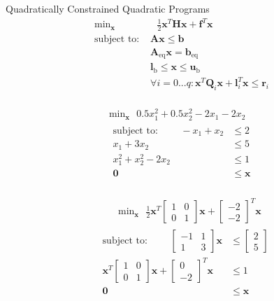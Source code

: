 \documentclass{article}
\begin{document}
Quadratically Constrained Quadratic Programs
\begin{align*}
    \text{min}_{\mathbf{x}}& \text{ } \frac{1}{2}\mathbf{x}^T \mathbf{H} \mathbf{x} + \mathbf{f}^T \mathbf{x} \\
    \mbox{subject to: }& \mathbf{A}\mathbf{x} \le \mathbf{b}\\
                       & \mathbf{A}_{\text{eq}}\mathbf{x} = \mathbf{b}_{\text{eq}}\\
                       & \mathbf{l}_{\text{b}} \le \mathbf{x} \le \mathbf{u}_{\text{b}}\\
                       & \forall i = 0...q : \mathbf{x}^T \mathbf{Q}_i \mathbf{x} + \mathbf{l}_i^T \mathbf{x} \le \mathbf{r}_i\\
\end{align*}

\begin{align*}
    \text{min}_{\mathbf{x}} \text{ } 0.5x_1^2 + 0.5x_2^2 - 2x_1 - 2x_2\\
    \begin{aligned}
    \mbox{subject to: } \qquad -x_1 + x_2 &\le 2\\
                        x_1 + 3x_2 &\le 5\\
                        x_1^2 + x_2^2 - 2x_2 &\le 1\\
                        \mathbf{0} &\le \mathbf{x}\\
    \end{aligned}
\end{align*}

\begin{align*}
    &\qquad \text{min}_{\mathbf{x}} \text{ } \frac{1}{2}\mathbf{x}^T \begin{bmatrix} 1 & 0 \\ 0 & 1 \end{bmatrix} \mathbf{x} +
                                        \begin{bmatrix} -2 \\ -2 \end{bmatrix}^T \mathbf{x}\\
    &\begin{aligned}
    \mbox{subject to: } \qquad \begin{bmatrix} -1 & 1 \\ 1 & 3 \end{bmatrix} \mathbf{x} &\le \begin{bmatrix} 2 \\ 5 \end{bmatrix}\\
                        \mathbf{x}^T \begin{bmatrix} 1 & 0 \\ 0 & 1 \end{bmatrix} \mathbf{x} + \begin{bmatrix} 0 \\ -2 \end{bmatrix}^T \mathbf{x}
                        &\le 1\\
                        \mathbf{0} &\le \mathbf{x}\\
    \end{aligned}
\end{align*}
\end{document}
